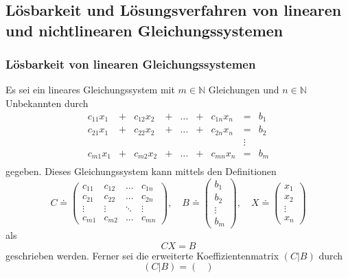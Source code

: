 \documentclass[a4paper,12pt]{article}
\numberwithin{equation}{section}
\begin{document}
\subsection{Lösbarkeit und Lösungsverfahren von linearen und nichtlinearen Gleichungssystemen}
\subsubsection{Lösbarkeit von linearen Gleichungssystemen}
Es sei ein lineares Gleichungssystem mit $m\in \mathbb{N}$ Gleichungen und $n\in \mathbb{N}$ Unbekannten durch \begin{equation}
\begin{matrix}
c_{11}x_1 & + & c_{12}x_2 & + & \dots & + & c_{1n}x_n & = & b_1 \\
c_{21}x_1 & + & c_{22}x_2 & + & \dots & + & c_{2n}x_n & = & b_2 \\
 &  &  &  &  &  &  & \vdots &  \\
c_{m1}x_1 & + & c_{m2}x_2 & + & \dots & + & c_{mn}x_n & = & b_m \\
\end{matrix}
\end{equation} gegeben. Dieses Gleichungssystem kann mittels den Definitionen \begin{equation}
C \doteq \begin{pmatrix}
c_{11} & c_{12} & \dots & c_{1n} \\
c_{21} & c_{22} & \dots & c_{2n} \\
\vdots & \vdots & \ddots & \vdots \\
c_{m1} & c_{m2} & \dots & c_{mn}
\end{pmatrix}, \quad B \doteq \begin{pmatrix}
b_1 \\ b_2 \\ \vdots \\ b_m
\end{pmatrix}, \quad X \doteq \begin{pmatrix}
x_1 \\ x_2 \\ \vdots \\ x_n
\end{pmatrix}
\end{equation} als \begin{equation}
CX = B
\end{equation} geschrieben werden. Ferner sei die erweiterte Koeffizientenmatrix $(C|B)$ durch \begin{equation}
(C|B) = \begin{pmatrix}

\end{pmatrix}
\end{equation}
\end{document}
